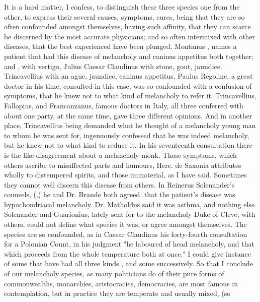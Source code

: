 It is a hard matter, I confess, to distinguish these three species one from the
other, to express their several causes, symptoms, cures, being that they are so
often confounded amongst themselves, having such affinity, that they can scarce
be discerned by the most accurate physicians; and so often intermixed with
other diseases, that the best experienced have been plunged. Montanus
, names a patient that had this disease of
melancholy and caninus appetitus both together; and
, with vertigo, Julius
Caesar Claudinus with stone, gout, jaundice. Trincavellius with an ague,
jaundice, caninus appetitus, \etc{} Paulus Regoline, a
great doctor in his time, consulted in this case, was so confounded with a
confusion of symptoms, that he knew not to what kind of melancholy to refer it.
Trincavellius, Fallopius, and Francanzanus, famous doctors
in Italy, all three conferred with about one party, at the same time, gave
three different opinions. And in another place, Trincavellius being demanded
what he thought of a melancholy young man to whom he was sent for, ingenuously
confessed that he was indeed melancholy, but he knew not to what kind to reduce
it. In his seventeenth consultation there is the like disagreement about a
melancholy monk. Those symptoms, which others ascribe to misaffected parts and
humours, Herc. de Saxonia attributes wholly to distempered
spirits, and those immaterial, as I have said. Sometimes they cannot well
discern this disease from others. In Reinerus Solenander's counsels,
(,) he and Dr. Brande both agreed, that
the patient's disease was hypochondriacal melancholy. Dr. Matholdus said it was
asthma, and nothing else. Solenander and Guarionius,
lately sent for to the melancholy Duke of Cleve, with others, could not define
what species it was, or agree amongst themselves. The species are so
confounded, as in Caesar Claudinus his forty-fourth consultation for a Polonian
Count, in his judgment "he laboured of head melancholy,
and that which proceeds from the whole temperature both at once." I could give
instance of some that have had all three kinds , and some
successively. So that I conclude of our melancholy species, as
many politicians do of their pure forms of commonwealths,
monarchies, aristocracies, democracies, are most famous in contemplation, but
in practice they are temperate and usually mixed, (so
